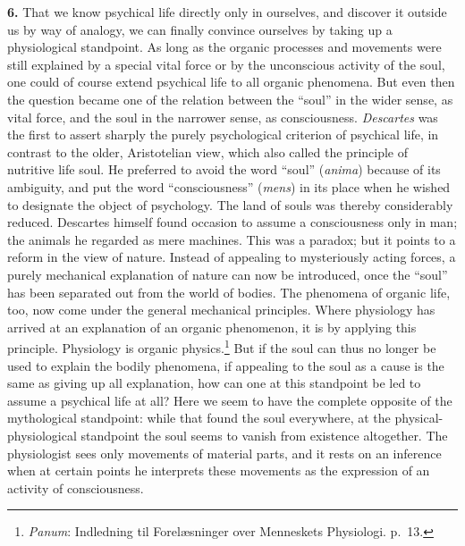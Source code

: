 \documentclass[12pt,a4paper]{book}
\newcommand{\opage}[1]{\marginnote{\footnotesize\textit{[#1]}}}
\begin{document}
\textbf{6.} That we know psychical life directly only in ourselves, and
discover it outside us by way of analogy, we can finally convince
ourselves by taking up a physiological standpoint. As long as the
organic processes and movements were still explained by a special vital
force or by the unconscious activity of the soul, one could of course
extend psychical life to all organic phenomena. But even then the
\opage{11}question became one of the relation between the ``soul'' in the
wider sense, as vital force, and the soul in the narrower sense, as
consciousness. \emph{Descartes} was the first to assert sharply the
purely psychological criterion of psychical life, in contrast to the
older, Aristotelian view, which also called the principle of nutritive
life soul. He preferred to avoid the word ``soul'' (\textit{anima}) because
of its ambiguity, and put the word ``consciousness'' (\textit{mens}) in its
place when he wished to designate the object of psychology. The land of
souls was thereby considerably reduced. Descartes himself found occasion
to assume a consciousness only in man; the animals he regarded as mere
machines. This was a paradox; but it points to a reform in the view of
nature. Instead of appealing to mysteriously acting forces, a purely
mechanical explanation of nature can now be introduced, once the
``soul'' has been separated out from the world of bodies. The phenomena
of organic life, too, now come under the general mechanical principles.
Where physiology has arrived at an explanation of an organic phenomenon,
it is by applying this principle.
Physiology is organic physics.\footnote{\emph{Panum}: Indledning til
Forelæsninger over Menneskets Physiologi. p.~13.} But if the soul can
thus no longer be used to explain the bodily phenomena, if appealing to
the soul as a cause is the same as giving up all explanation, how can
one at this standpoint be led to assume a psychical life at all? Here we
seem to have the complete opposite of the mythological standpoint: while
that found the soul everywhere, at the physical-physiological standpoint
the soul seems to vanish from existence altogether. The physiologist
sees only movements of material parts, and it rests on an inference when
at certain points he interprets these movements as the expression of an
activity of consciousness.
\end{document}
